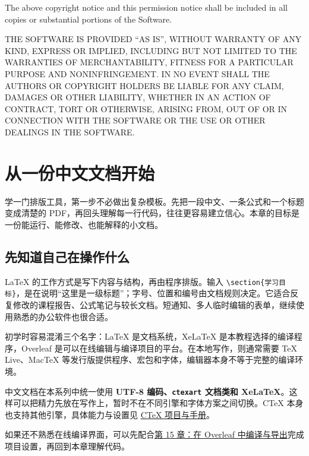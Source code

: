 \documentclass[UTF8,a4paper,11pt,fontset=fandol,oneside,openany]{ctexbook}
\begin{document}
The above copyright notice and this permission notice shall be included in all copies or substantial portions of the Software.

THE SOFTWARE IS PROVIDED ``AS IS'', WITHOUT WARRANTY OF ANY KIND, EXPRESS OR IMPLIED, INCLUDING BUT NOT LIMITED TO THE WARRANTIES OF MERCHANTABILITY, FITNESS FOR A PARTICULAR PURPOSE AND NONINFRINGEMENT. IN NO EVENT SHALL THE AUTHORS OR COPYRIGHT HOLDERS BE LIABLE FOR ANY CLAIM, DAMAGES OR OTHER LIABILITY, WHETHER IN AN ACTION OF CONTRACT, TORT OR OTHERWISE, ARISING FROM, OUT OF OR IN CONNECTION WITH THE SOFTWARE OR THE USE OR OTHER DEALINGS IN THE SOFTWARE.
\endgroup
\clearpage
\tableofcontents
\mainmatter

\chapter[从一份中文文档开始]{从一份中文文档开始}
\label{chapter:01}
\par\medskip
学一门排版工具，第一步不必做出复杂模板。先把一段中文、一条公式和一个标题变成清楚的 PDF，再回头理解每一行代码，往往更容易建立信心。本章的目标是一份能运行、能修改、也能解释的小文档。

\section{先知道自己在操作什么}\label{c01-ux5148ux77e5ux9053ux81eaux5df1ux5728ux64cdux4f5cux4ec0ux4e48}

LaTeX 的工作方式是写下内容与结构，再由程序排版。输入 \texttt{\textbackslash{}\allowbreak{}section\{\allowbreak{}学习目标\}\allowbreak{}}，是在说明``这里是一级标题''；字号、位置和编号由文档规则决定。它适合反复修改的课程报告、公式笔记与较长文档。短通知、多人临时编辑的表单，继续使用熟悉的办公软件也很合适。

初学时容易混淆三个名字：LaTeX 是文档系统，XeLaTeX 是本教程选择的编译程序，Overleaf 是可以在线编辑与编译项目的平台。在本地写作，则通常需要 TeX Live、MacTeX 等发行版提供程序、宏包和字体，编辑器本身不等于完整的编译环境。

中文文档在本系列中统一使用 \textbf{UTF-8 编码、\texttt{ctexart} 文档类和 XeLaTeX}。这样可以把精力先放在写作上，暂时不在不同引擎和字体方案之间切换。CTeX 本身也支持其他引擎，具体能力与设置见 \href{https://ctan.org/pkg/ctex}{CTeX 项目与手册}。

如果还不熟悉在线编译界面，可以先配合\href{https://pzy54154631-hub.github.io/liuyihan/blog/latex-15-overleaf-workflow/}{第 15 章：在 Overleaf 中编译与导出}完成项目设置，再回到本章理解代码。
\end{document}
